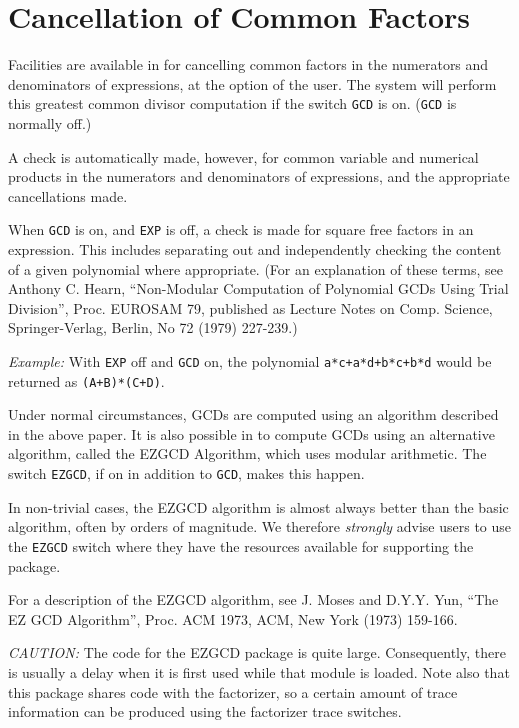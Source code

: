 \section{Cancellation of Common Factors}
Facilities are available in {\REDUCE} for cancelling common factors in the
numerators and denominators of expressions, at the option of the user. The
system will perform this greatest common divisor computation if the switch
{\tt GCD} is on. ({\tt GCD} is normally off.)

A check is automatically made, however, for common variable and numerical
products in the numerators and denominators of expressions, and the
appropriate cancellations made.

When {\tt GCD} is on, and {\tt EXP} is off, a check is made for square
free factors in an expression.  This includes separating out and
independently checking the content of a given polynomial where
appropriate. (For an explanation of these terms, see Anthony C. Hearn,
``Non-Modular Computation of Polynomial GCDs Using Trial Division'', Proc.
EUROSAM 79, published as Lecture Notes on Comp.  Science, Springer-Verlag,
Berlin, No 72 (1979) 227-239.)

{\it Example:} With {\tt EXP} off and {\tt GCD}
on,
the polynomial {\tt a*c+a*d+b*c+b*d} would be returned as {\tt (A+B)*(C+D)}.

Under normal circumstances, GCDs are computed using an algorithm described
in the above paper. It is also possible in {\REDUCE} to compute GCDs using
an alternative algorithm, called the EZGCD Algorithm, which uses modular
arithmetic.  The switch {\tt EZGCD}, if on in addition to
{\tt GCD}, makes this happen.

In non-trivial cases, the EZGCD algorithm is almost always better
than the basic algorithm, often by orders of magnitude.  We therefore
{\em strongly\/} advise users to use the {\tt EZGCD} switch where they have the
resources available for supporting the package.

For a description of the EZGCD algorithm, see J. Moses and D.Y.Y. Yun,
``The EZ GCD Algorithm'', Proc. ACM 1973, ACM, New York (1973) 159-166.

{\it CAUTION:} The code for the EZGCD package is quite large. Consequently,
there is usually a delay when it is first used while that module is
loaded. Note also that this package shares code with the factorizer, so a
certain amount of trace information can be produced using the factorizer
trace switches.

